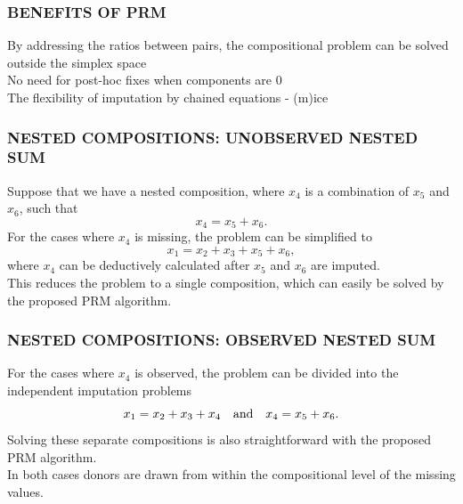 \documentclass[aspectratio=169]{beamer} %
\begin{document}
\begin{frame}
  \frametitle{BENEFITS OF PRM}
By addressing the ratios between pairs, the compositional problem can be solved outside the simplex space
\newline \\
No need for post-hoc fixes when components are 0
\newline \\
The flexibility of imputation by chained equations - (m)ice

\end{frame}

\begin{frame}
  \frametitle{NESTED COMPOSITIONS: UNOBSERVED NESTED SUM}
Suppose that we have a nested composition, where $x_4$ is a combination of $x_5$ and $x_6$, such that
\begin{equation*}
x_4=x_5+x_6.
\end{equation*}
For the cases where $x_4$ is missing, the problem can be simplified to 
\begin{equation*}
x_1=x_2+x_3+x_5+x_6,
\end{equation*}
where $x_4$ can be deductively calculated after $x_5$ and $x_6$ are imputed. 
\newline \\
This reduces the problem to a single composition, which can easily be solved by the proposed PRM algorithm.
\end{frame}

\begin{frame}
  \frametitle{NESTED COMPOSITIONS: OBSERVED NESTED SUM}
For the cases where $x_4$ is observed,  the problem can be divided into the independent imputation problems 
\begin{equation*}
x_1=x_2+x_3+x_4\quad \textnormal{and}\quad x_4=x_5+x_6.
\end{equation*} 
Solving these separate compositions is also straightforward with the proposed PRM algorithm.
\newline \\
In both cases donors are drawn from within the compositional level of the missing values. 
\end{frame}
\end{document}
